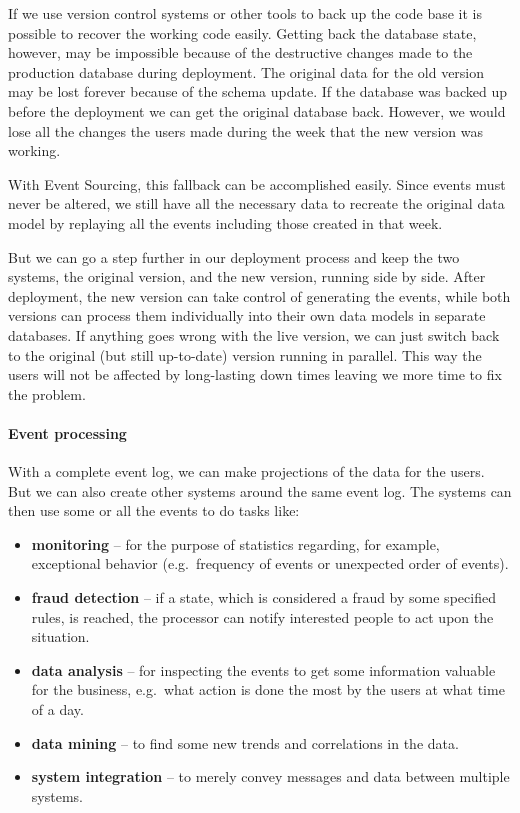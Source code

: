\documentclass{book}
\begin{document}
If we use version control systems or other tools to back up the code
base it is possible to recover the working code easily. Getting back the
database state, however, may be impossible because of the destructive
changes made to the production database during deployment. The original
data for the old version may be lost forever because of the schema
update. If the database was backed up before the deployment we can get
the original database back. However, we would lose all the changes the
users made during the week that the new version was working.~\cite{greg-youtube}

With Event Sourcing, this fallback can be accomplished easily. Since
events must never be altered, we still have all the necessary data to
recreate the original data model by replaying all the events including
those created in that week.

But we can go a step further in our deployment process and keep the two
systems, the original version, and the new version, running side by
side. After deployment, the new version can take control of generating
the events, while both versions can process them individually into their
own data models in separate databases. If anything goes wrong with the
live version, we can just switch back to the original (but still
up-to-date) version running in parallel. This way the users will not be
affected by long-lasting down times leaving we more time to fix the
problem.

\paragraph{Event processing}\label{event-processing}

With a complete event log, we can make projections of the data for the
users. But we can also create other systems around the same event log.
The systems can then use some or all the events to do tasks like:

\begin{itemize}
\tightlist
\item
  \textbf{monitoring} -- for the purpose of statistics regarding, for
  example, exceptional behavior (e.g.~frequency of events or unexpected
  order of events).
\item
  \textbf{fraud detection} -- if a state, which is considered a fraud by
  some specified rules, is reached, the processor can notify interested
  people to act upon the situation.
\item
  \textbf{data analysis} -- for inspecting the events to get some
  information valuable for the business, e.g.~what action is done the
  most by the users at what time of a day.
\item
  \textbf{data mining} -- to find some new trends and correlations in
  the data.
\item
  \textbf{system integration} -- to merely convey messages and data
  between multiple systems.
\end{itemize}
\end{document}
